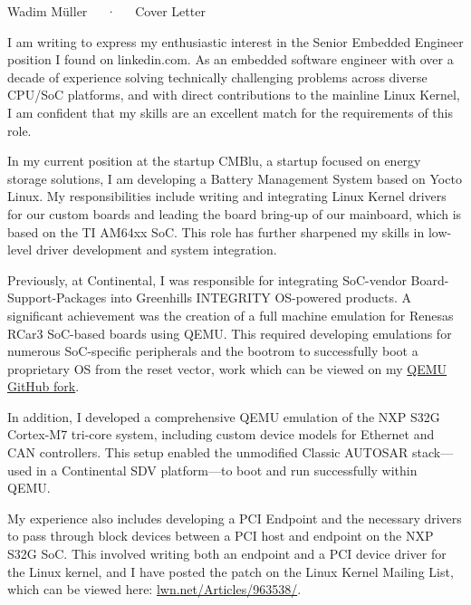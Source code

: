\documentclass[11pt, a4paper]{awesome-cv}
\begin{document}
\makecvheader[R]

\makecvfooter
  {}
  {Wadim Müller~~~·~~~Cover Letter}
  {}

\makelettertitle

\begin{cvletter}

I am writing to express my enthusiastic interest in the Senior Embedded Engineer position I found on linkedin.com. As an embedded software engineer with over a decade of experience solving technically challenging problems across diverse CPU/SoC platforms, and with direct contributions to the mainline Linux Kernel, I am confident that my skills are an excellent match for the requirements of this role.

In my current position at the startup CMBlu, a startup focused on energy storage solutions, I am developing a Battery Management System based on Yocto Linux. My responsibilities include writing and integrating Linux Kernel drivers for our custom boards and leading the board bring-up of our mainboard, which is based on the TI AM64xx SoC. This role has further sharpened my skills in low-level driver development and system integration.

Previously, at Continental, I was responsible for integrating SoC-vendor Board-Support-Packages into Greenhills INTEGRITY OS-powered products. A significant achievement was the creation of a full machine emulation for Renesas RCar3 SoC-based boards using QEMU. This required developing emulations for numerous SoC-specific peripherals and the bootrom to successfully boot a proprietary OS from the reset vector, work which can be viewed on my \href{https://github.com/wafgo/qemu/tree/rcar3_port}{QEMU GitHub fork}.

In addition, I developed a comprehensive QEMU emulation of the NXP S32G Cortex-M7 tri-core system, including custom device models for Ethernet and CAN controllers. This setup enabled the unmodified Classic AUTOSAR stack—used in a Continental SDV platform—to boot and run successfully within QEMU.


My experience also includes developing a PCI Endpoint and the necessary drivers to pass through block devices between a PCI host and endpoint on the NXP S32G SoC. This involved writing both an endpoint and a PCI device driver for the Linux kernel, and I have posted the patch on the Linux Kernel Mailing List, which can be viewed here: \href{https://lwn.net/Articles/963538/}{lwn.net/Articles/963538/}.


\end{cvletter}
\end{document}

